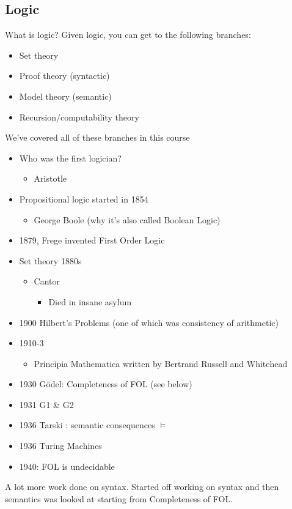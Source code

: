 \documentclass[11pt]{article}
\begin{document}
\subsection{Logic}
\label{sec:org847bb7d}
What is logic?
Given logic, you can get to the following branches:
\begin{itemize}
\item Set theory
\item Proof theory (syntactic)
\item Model theory (semantic)
\item Recursion/computability theory
\end{itemize}
We've covered all of these branches in this course
\begin{itemize}
\item Who was the first logician?
\begin{itemize}
\item Aristotle
\end{itemize}
\item Propositional logic started in 1854
\begin{itemize}
\item George Boole (why it's also called Boolean Logic)
\end{itemize}
\item 1879, Frege invented First Order Logic
\item Set theory 1880s
\begin{itemize}
\item Cantor
\begin{itemize}
\item Died in insane asylum
\end{itemize}
\end{itemize}
\item 1900 Hilbert's Problems (one of which was consistency of arithmetic)
\item 1910-3
\begin{itemize}
\item Principia Mathematica written by Bertrand Russell and Whitehead
\end{itemize}
\item 1930 Gödel: Completeness of FOL (see below)
\item 1931 G1 \& G2
\item 1936 Tarski : semantic consequences \(\models\)
\item 1936 Turing Machines
\item 1940: FOL is undecidable
\end{itemize}
A lot more work done on syntax. Started off working on syntax and then semantics was looked at starting from Completeness of FOL.
\end{document}
